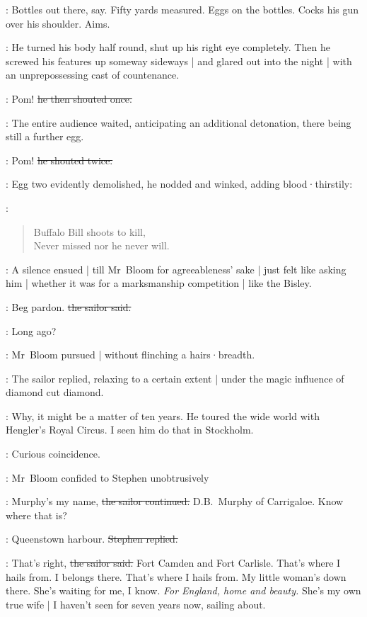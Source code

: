 \Murphy:
Bottles out there,
say.
Fifty yards measured.
Eggs on the bottles.
Cocks his gun over his shoulder.
Aims.

:
He turned his body half round,
shut up his right eye completely.
Then he screwed his features up someway sideways |
and glared out into the night |
with an unprepossessing cast of countenance.

\Murphy:
Pom!
\sout{he then shouted once.}

:
The entire audience waited,
anticipating an additional detonation,
there being still a further egg.%


\Murphy:
Pom!
\sout{he shouted twice.}

:
Egg two evidently demolished,
he nodded and winked,
adding blood·thirstily:

\Murphy:
\begin{verse}
    Buffalo Bill shoots to kill,\\
    Never missed nor he never will.
\end{verse}

:
A silence ensued |
till Mr~Bloom for agreeableness' sake |
just felt like asking him |
whether it was for a marksmanship competition |
like the Bisley.

\Murphy:
Beg pardon.
\sout{the sailor said.}

\Bloom:
Long ago?

:
Mr~Bloom pursued |
without flinching a hairs·breadth.

:
The sailor replied,
relaxing to a certain extent |
under the magic influence of diamond cut diamond.

\Murphy:
Why,
it might be a matter of ten years.
He toured the wide world with Hengler's Royal Circus.
I seen him do that in Stockholm.

\Bloom:
Curious coincidence.

:
Mr~Bloom confided to Stephen unobtrusively

\Murphy:
Murphy's my name,
\sout{the sailor continued.}
D.B.~Murphy of Carrigaloe.
Know where that is?

\Stephen:
Queenstown harbour.
\sout{Stephen replied.}

\Murphy:
That's right,
\sout{the sailor said.}
Fort Camden and Fort Carlisle.
That's where I hails from.
I belongs there.
That's where I hails from.
My little woman's down there.
She's waiting for me,
I know.
\emph{For England,
home and beauty.}
She's my own true wife |
I haven't seen for seven years now,
sailing about.

